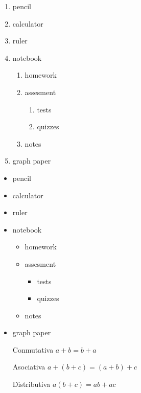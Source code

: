 \documentclass[11pt]{article}
\begin{document}
\begin{enumerate}
\item pencil
\item calculator
\item ruler
\item notebook
	\begin{enumerate}
	\item homework
	\item assesment
		\begin{enumerate}
		\item tests
		\item quizzes
		\end{enumerate}
	\item notes
	\end{enumerate}
\item graph paper
\end{enumerate}
\begin{itemize}
\item pencil
\item calculator
\item ruler
\item notebook
	\begin{itemize}
	\item homework
	\item assesment
		\begin{itemize}
		\item tests
		\item quizzes
		\end{itemize}
	\item notes
	\end{itemize}
\item graph paper
\end{itemize}
\begin{enumerate}
\item[Conmutativa] $a+b=b+a$
\item[Asociativa] $a+(b+c)=(a+b)+c$
\item[Distributiva] $a(b+c)=ab+ac$
\end{enumerate}
\end{document}
